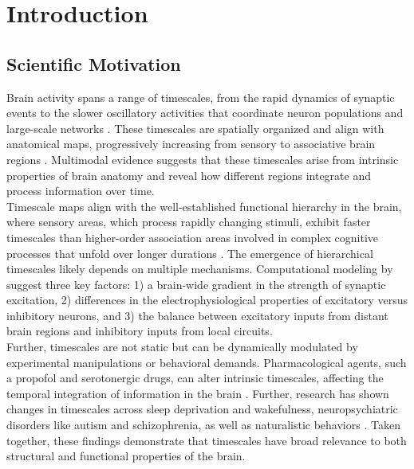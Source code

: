 \documentclass[latex/main.tex]{subfiles}
\begin{document}
\section{Introduction}

\subsection{Scientific Motivation} 
Brain activity spans a range of timescales, from the rapid dynamics of synaptic events to the slower oscillatory activities that coordinate neuron populations and large-scale networks \citep{buzsaki_large-scale_2004}. These timescales are spatially organized and align with anatomical maps, progressively increasing from sensory to associative brain regions \citep{raut_hierarchical_2020, gao_neuronal_2020, hasson_hierarchy_2008}. Multimodal evidence suggests that these timescales arise from intrinsic properties of brain anatomy and reveal how different regions integrate and process information over time.\\

Timescale maps align with the well-established functional hierarchy in the brain, where sensory areas, which process rapidly changing stimuli, exhibit faster timescales than higher-order association areas involved in complex cognitive processes that unfold over longer durations \citep{murray_hierarchy_2014, hasson_hierarchy_2008, stephens_place_2013}. The emergence of hierarchical timescales likely depends on multiple mechanisms. Computational modeling by \citet{li_hierarchical_2022} suggest three key factors: 1) a brain-wide gradient in the strength of synaptic excitation, 2) differences in the electrophysiological properties of excitatory versus inhibitory neurons, and 3) the balance between excitatory inputs from distant brain regions and inhibitory inputs from local circuits.\\

Further, timescales are not static but can be dynamically modulated by experimental manipulations or behavioral demands. Pharmacological agents, such a propofol and serotonergic drugs, can alter intrinsic timescales, affecting the temporal integration of information in the brain \citep{huang_timescales_2018, shinn_functional_2023}. Further, research has shown changes in timescales across sleep deprivation and wakefulness, neuropsychiatric disorders like autism and schizophrenia, as well as naturalistic behaviors \citep{meisel_decline_2017, watanabe_atypical_2019, wengler_distinct_2020, manea_neural_2024}. Taken together, these findings demonstrate that timescales have broad relevance to both structural and functional properties of the brain.\\
\end{document}

